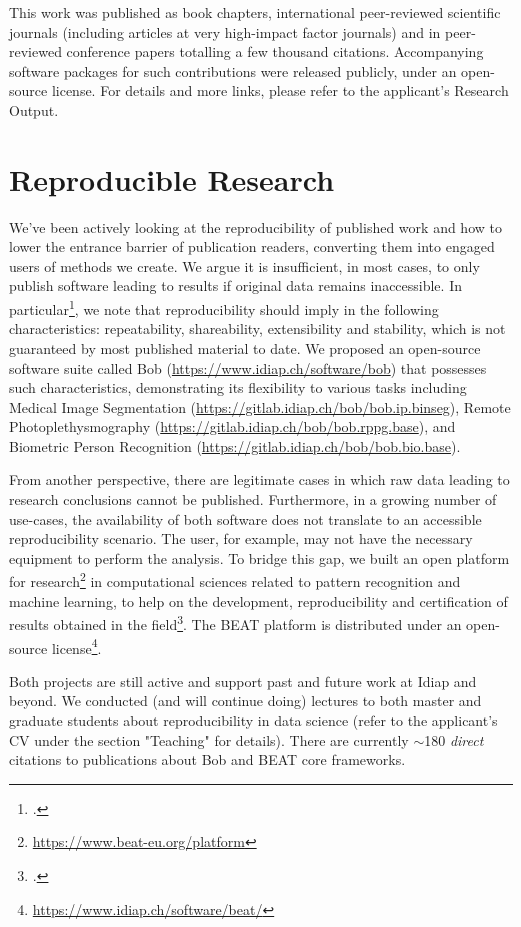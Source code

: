 \documentclass[a4paper,10pt,onecolumn]{article}
\begin{document}
This work was published as book chapters, international peer-reviewed
scientific journals (including articles at very high-impact factor journals)
and in peer-reviewed conference papers totalling a few thousand citations.
Accompanying software packages for such contributions were released publicly,
under an open-source license. For details and more links, please refer to the
applicant's Research Output.

\section{Reproducible Research}

We've been actively looking at the reproducibility of published work and how to
lower the entrance barrier of publication readers, converting them into engaged
users of methods we create.  We argue it is insufficient, in most cases, to
only publish software leading to results if original data remains inaccessible.
In particular\footcite{icml-2017-2}, we note that reproducibility should imply
in the following characteristics: repeatability, shareability, extensibility
and stability, which is not guaranteed by most published material to date.  We
proposed an open-source software suite called Bob
(\url{https://www.idiap.ch/software/bob}) that possesses such characteristics,
demonstrating its flexibility to various tasks including Medical Image
Segmentation (\url{https://gitlab.idiap.ch/bob/bob.ip.binseg}), Remote
Photoplethysmography (\url{https://gitlab.idiap.ch/bob/bob.rppg.base}), and
Biometric Person Recognition (\url{https://gitlab.idiap.ch/bob/bob.bio.base}).

From another perspective, there are legitimate cases in which raw data leading
to research conclusions cannot be published.  Furthermore, in a growing number
of use-cases, the availability of both software does not translate to an
accessible reproducibility scenario.  The user, for example, may not have the
necessary equipment to perform the analysis.  To bridge this gap, we built an
open platform for research\footnote{\url{https://www.beat-eu.org/platform}} in
computational sciences related to pattern recognition and machine learning, to
help on the development, reproducibility and certification of results obtained
in the field\footcite{icml-2017-1}.  The BEAT platform is distributed under an
open-source license\footnote{\url{https://www.idiap.ch/software/beat/}}.

Both projects are still active and support past and future work at Idiap and
beyond.  We conducted (and will continue doing) lectures to both master and
graduate students about reproducibility in data science (refer to the
applicant's CV under the section "Teaching" for details).  There are currently
$\sim$180 \textit{direct} citations to publications about Bob and BEAT core
frameworks.
\end{document}
